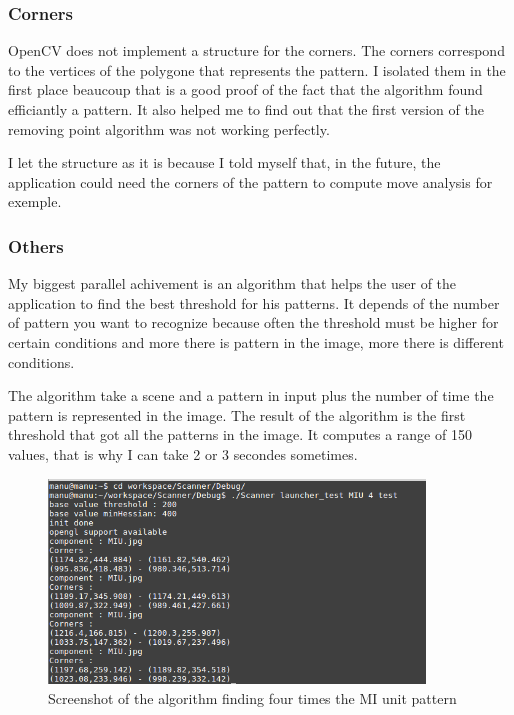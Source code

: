 \documentclass[english,a4paper,11pt]{report}
\begin{document}
	\subsubsection{Corners}
	\par OpenCV does not implement a structure for the corners. The corners correspond to the vertices of the polygone that represents the pattern. I isolated them in the first place beaucoup that is a good proof of the fact that the algorithm found efficiantly a pattern. It also helped me to find out that the first version of the removing point algorithm was not working perfectly.
	\par I let the structure as it is because I told myself that, in the future, the application could need the corners of the pattern to compute move analysis for exemple. 	
	
	\subsubsection{Others}
	
	\par My biggest parallel achivement is an algorithm that helps the user of the application to find the best threshold for his patterns. It depends of the number of pattern you want to recognize because often the threshold must be higher for certain conditions and more there is pattern in the image, more there is different conditions. 
	\par The algorithm take a scene and a pattern in input plus the number of time the pattern is represented in the image. The result of the algorithm is the first threshold that got all the patterns in the image. It computes a range of 150 values, that is why I can take 2 or 3 secondes sometimes.
	
	\begin{figure}[h]
		\begin{center}
			\includegraphics[width=10cm]{images_not_compressed/tester.png}
			\caption{Screenshot of the algorithm finding four times the MI unit pattern}
			\label{OutIn}	
		\end{center}
	\end{figure}	
	
\end{document}
